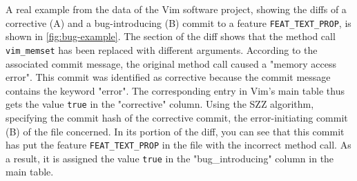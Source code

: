 \begin{table}[ht]
\centering
\caption{Number of corrective and bug-introducing commits and number of identified features}
\label{tab:tools-values2}
\end{table}

A real example from the data of the Vim software project, showing the diffs of a corrective (A) and a bug-introducing (B) commit to a feature \texttt{FEAT\_TEXT\_PROP}, is shown in \autoref{fig:bug-example}. The section of the diff shows that the method call \texttt{vim\_memset} has been replaced with different arguments. According to the associated commit message, the original method call caused a "memory access error". This commit was identified as corrective because the commit message contains the keyword "error". The corresponding entry in Vim's main table thus gets the value \texttt{true} in the "corrective" column. Using the SZZ algorithm, specifying the commit hash of the corrective commit, the error-initiating commit (B) of the file concerned. In its portion of the diff, you can see that this commit has put the feature \texttt{FEAT\_TEXT\_PROP} in the file with the incorrect method call. As a result, it is assigned the value \texttt{true} in the "bug\_introducing" column in the main table.

